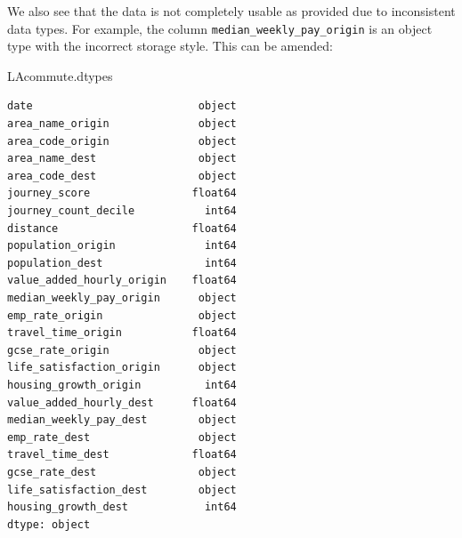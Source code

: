 \documentclass[
  number]{elsarticle}
\newenvironment{Shaded}{\begin{snugshade}}{\end{snugshade}}
\newcommand{\NormalTok}[1]{\textcolor[rgb]{0.00,0.23,0.31}{#1}}
\begin{document}
We also see that the data is not completely usable as provided due to
inconsistent data types. For example, the column
\texttt{\textquotesingle{}median\_weekly\_pay\_origin\textquotesingle{}}
is an object type with the incorrect storage style. This can be amended:

\begin{Shaded}
\begin{Highlighting}[]
\NormalTok{LAcommute.dtypes}
\end{Highlighting}
\end{Shaded}

\begin{verbatim}
date                          object
area_name_origin              object
area_code_origin              object
area_name_dest                object
area_code_dest                object
journey_score                float64
journey_count_decile           int64
distance                     float64
population_origin              int64
population_dest                int64
value_added_hourly_origin    float64
median_weekly_pay_origin      object
emp_rate_origin               object
travel_time_origin           float64
gcse_rate_origin              object
life_satisfaction_origin      object
housing_growth_origin          int64
value_added_hourly_dest      float64
median_weekly_pay_dest        object
emp_rate_dest                 object
travel_time_dest             float64
gcse_rate_dest                object
life_satisfaction_dest        object
housing_growth_dest            int64
dtype: object
\end{verbatim}
\end{document}
